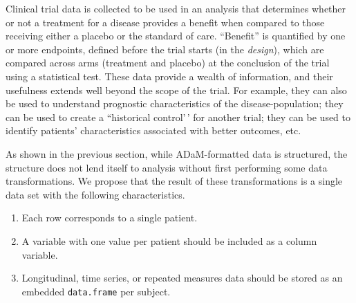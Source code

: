 Clinical trial data is collected to be used in an analysis that
determines whether or not a treatment for a disease provides a benefit
when compared to those receiving either a placebo or the standard of
care. ``Benefit'' is quantified by one or more endpoints, defined before
the trial starts (in the \emph{design}), which are compared across arms
(treatment and placebo) at the conclusion of the trial using a
statistical test. These data provide a wealth of information, and their
usefulness extends well beyond the scope of the trial. For example, they
can also be used to understand prognostic characteristics of the
disease-population; they can be used to create a ``historical
control'\,' for another trial; they can be used to identify patients'
characteristics associated with better outcomes, etc.

As shown in the previous section, while ADaM-formatted data is
structured, the structure does not lend itself to analysis without first
performing some data transformations. We propose that the result of
these transformations is a single data set with the following
characteristics.

\begin{enumerate}
\def\labelenumi{\arabic{enumi}.}
\tightlist
\item
  Each row corresponds to a single patient.
\item
  A variable with one value per patient should be included as a column
  variable.
\item
  Longitudinal, time series, or repeated measures data should be stored
  as an embedded \texttt{data.frame} per subject.
\end{enumerate}

